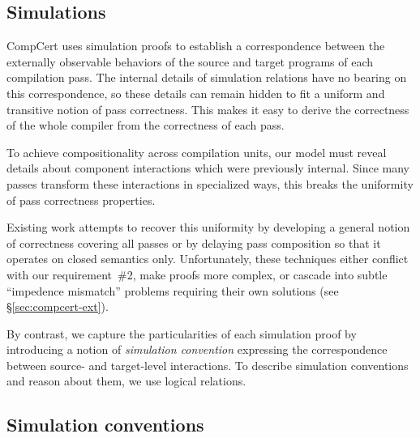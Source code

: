 \documentclass[draft,11pt]{report}
\theoremstyle{definition}
\begin{document}


\subsection{Simulations} %

CompCert uses simulation proofs
to establish a correspondence between
the externally observable behaviors of
the source and target programs of each compilation pass.
The internal details of simulation relations
have no bearing on this correspondence,
so these details can remain hidden
to fit a uniform and transitive notion of pass correctness.
This makes it easy to derive the correctness
of the whole compiler
from the correctness of each pass.

To achieve compositionality across compilation units,
our model must reveal details
about component interactions
which were previously internal.
Since many passes transform
these interactions in
specialized ways,
this breaks the uniformity
of pass correctness properties.

Existing work attempts to recover this uniformity
by developing a general notion of correctness
covering all passes
or by delaying pass composition so that
it operates on closed semantics only.
Unfortunately, these techniques either
conflict with our requirement~\#2,
make proofs more complex,
or cascade into subtle ``impedence mismatch'' problems
requiring their own solutions
(see \S\ref{sec:compcert-ext}).

By contrast,
we capture the particularities of each simulation proof
by introducing a notion of \emph{simulation convention}
expressing the correspondence between
source- and target-level interactions.
To describe simulation conventions
and reason about them,
we use logical relations.


\subsection{Simulation conventions} \label{sec:simconv} %
\end{document}

